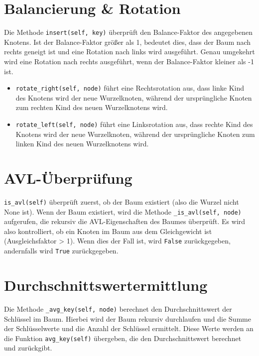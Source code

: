 \documentclass{article}
\begin{document}
\section*{Balancierung \& Rotation}
Die Methode \texttt{insert(self, key)} überprüft den Balance-Faktor des angegebenen Knotens. Ist der Balance-Faktor größer als 1, bedeutet dies, dass der Baum nach rechts geneigt ist und
eine Rotation nach links wird ausgeführt. Genau umgekehrt wird eine Rotation nach rechts ausgeführt, wenn der Balance-Faktor kleiner als -1 ist.
\begin{itemize}
    \item \texttt{rotate\_right(self, node)} führt eine Rechtsrotation aus, dass linke Kind des Knotens wird der neue Wurzelknoten, während der ursprüngliche Knoten zum rechten Kind des neuen Wurzelknotens wird.
    \item \texttt{rotate\_left(self, node)} führt eine Linksrotation aus, dass rechte Kind des Knotens wird der neue Wurzelknoten, während der ursprüngliche Knoten zum linken Kind des neuen Wurzelknotens wird.
\end{itemize}

\section*{AVL-Überprüfung}
\texttt{is\_avl(self)} überprüft zuerst, ob der Baum existiert (also die Wurzel nicht None ist). Wenn der Baum existiert, wird die Methode \texttt{\_is\_avl(self, node)} aufgerufen, die rekursiv die AVL-Eigenschaften des Baumes überprüft.
Es wird also kontrolliert, ob ein Knoten im Baum aus dem Gleichgewicht ist (Ausgleichsfaktor > 1). Wenn dies der Fall ist, wird \texttt{False} zurückgegeben, andernfalls wird \texttt{True} zurückgegeben.

\section*{Durchschnittswertermittlung}
Die Methode \texttt{\_avg\_key(self, node)} berechnet den Durchschnittswert der Schlüssel im Baum. Hierbei wird der Baum rekursiv durchlaufen und die Summe der Schlüsselwerte und die Anzahl der Schlüssel ermittelt.
Diese Werte werden an die Funktion \texttt{avg\_key(self)} übergeben, die den Durchschnittswert berechnet und zurückgibt.
\end{document}
